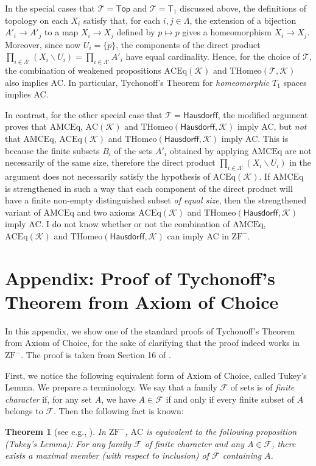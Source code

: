 \documentclass{article}
\newtheorem{theorem}{Theorem}
\begin{document}
In the special cases that $\mathcal{T} = \mathsf{Top}$ and $\mathcal{T} = \mathsf{T}_1$ discussed above, the definitions of topology on each $X_i$ satisfy that, for each $i,j \in \Lambda$, the extension of a bijection $A'_i \to A'_j$ to a map $X_i \to X_j$ defined by $p \mapsto p$ gives a homeomorphism $X_i \to X_j$.
Moreover, since now $U_i = \{p\}$, the components of the direct product $\prod_{i \in \Lambda'} (X_i \smallsetminus U_i) = \prod_{i \in \Lambda'} A'_i$ have equal cardinality.
Hence, for the choice of $\mathcal{T}$, the combination of weakened propositions $\mathrm{ACEq}(\mathcal{K})$ and $\mathrm{THomeo}(\mathcal{T},\mathcal{K})$ also implies AC.
In particular, Tychonoff's Theorem for \emph{homeomorphic} $T_1$ spaces implies AC.

In contrast, for the other special case that $\mathcal{T} = \mathsf{Hausdorff}$, the modified argument proves that $\mathrm{AMCEq}$, $\mathrm{AC}(\mathcal{K})$ and $\mathrm{THomeo}(\mathsf{Hausdorff},\mathcal{K})$ imply AC, but \emph{not} that $\mathrm{AMCEq}$, $\mathrm{ACEq}(\mathcal{K})$ and $\mathrm{THomeo}(\mathsf{Hausdorff},\mathcal{K})$ imply AC.
This is because the finite subsets $B_i$ of the sets $A'_i$ obtained by applying $\mathrm{AMCEq}$ are not necessarily of the same size, therefore the direct product $\prod_{i \in \Lambda'} (X_i \smallsetminus U_i)$ in the argument does not necessarily satisfy the hypothesis of $\mathrm{ACEq}(\mathcal{K})$.
If $\mathrm{AMCEq}$ is strengthened in such a way that each component of the direct product will have a finite non-empty distinguished subset \emph{of equal size}, then the strengthened variant of $\mathrm{AMCEq}$ and two axioms $\mathrm{ACEq}(\mathcal{K})$ and $\mathrm{THomeo}(\mathsf{Hausdorff},\mathcal{K})$ imply AC.
I do not know whether or not the combination of $\mathrm{AMCEq}$, $\mathrm{ACEq}(\mathcal{K})$ and $\mathrm{THomeo}(\mathsf{Hausdorff},\mathcal{K})$ can imply AC in $\mathrm{ZF}^-$.

\section*{Appendix: Proof of Tychonoff's Theorem from Axiom of Choice}

In this appendix, we show one of the standard proofs of Tychonoff's Theorem from Axiom of Choice, for the sake of clarifying that the proof indeed works in $\mathrm{ZF}^-$.
The proof is taken from Section 16 of \cite{AC_math}.

First, we notice the following equivalent form of Axiom of Choice, called Tukey's Lemma.
We prepare a terminology.
We say that a family $\mathcal{F}$ of sets is of \emph{finite character} if, for any set $A$, we have $A \in \mathcal{F}$ if and only if every finite subset of $A$ belongs to $\mathcal{F}$.
Then the following fact is known:
\begin{theorem}
[see e.g., {\cite[Exercise 11 in Chapter I]{Kunen}}]
\label{thm:Tukey}
In $\mathrm{ZF}^-$, $\mathrm{AC}$ is equivalent to the following proposition (\emph{Tukey's Lemma}): For any family $\mathcal{F}$ of finite character and any $A \in \mathcal{F}$, there exists a maximal member (with respect to inclusion) of $\mathcal{F}$ containing $A$.
\end{theorem}
\end{document}
